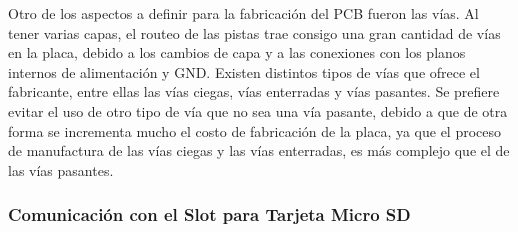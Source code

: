 


Otro de los aspectos a definir para la fabricación del PCB fueron las vías. Al tener varias capas, el routeo de las pistas trae consigo una gran cantidad de vías en la placa, debido a los cambios de capa y a las conexiones con los planos internos de alimentación y GND. Existen distintos tipos de vías que ofrece el fabricante, entre ellas las vías ciegas, vías enterradas y vías pasantes. %
Se prefiere evitar el uso de otro tipo de vía que no sea una vía pasante, debido a que de otra forma se incrementa mucho el costo de fabricación de la placa, ya que el proceso de manufactura de las vías ciegas y las vías enterradas, es más complejo que el de las vías pasantes.




\subsubsection{Comunicación con el Slot para Tarjeta Micro SD}




